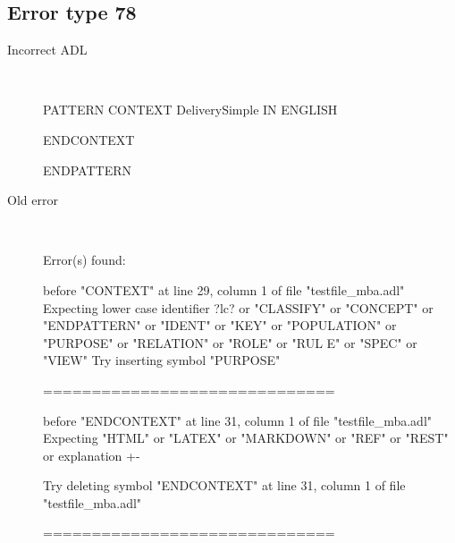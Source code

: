 \hrulefill

\subsection{Error type 78}
  \begin{description}
  \item[Incorrect ADL]~\\
\begin{adl}
PATTERN
CONTEXT DeliverySimple IN ENGLISH

ENDCONTEXT

ENDPATTERN\end{adl}
  \item[Old error]~\\
\begin{haskell}
Error(s) found:

before "CONTEXT" at line 29, column 1 of file "testfile_mba.adl"
Expecting lower case identifier ?lc? or "CLASSIFY" or "CONCEPT" or "ENDPATTERN"
or "IDENT" or "KEY" or "POPULATION" or "PURPOSE" or "RELATION" or "ROLE" or "RUL
E" or "SPEC" or "VIEW"
Try inserting symbol "PURPOSE"

==============================

before "ENDCONTEXT" at line 31, column 1 of file "testfile_mba.adl"
Expecting "HTML" or "LATEX" or "MARKDOWN" or "REF" or "REST" or explanation {+-}

Try deleting symbol "ENDCONTEXT" at line 31, column 1 of file "testfile_mba.adl"


==============================


\end{haskell}
\end{description}

